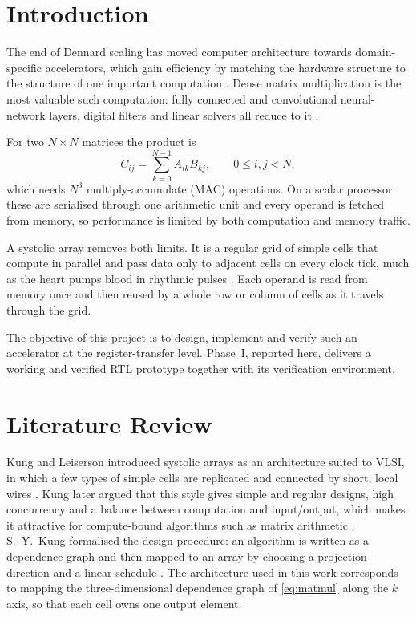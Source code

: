 \documentclass[conference]{IEEEtran}
\begin{document}
\section{Introduction}
The end of Dennard scaling has moved computer architecture towards
domain-specific accelerators, which gain efficiency by matching the hardware
structure to the structure of one important computation \cite{hennessy}. Dense
matrix multiplication is the most valuable such computation: fully connected
and convolutional neural-network layers, digital filters and linear solvers all
reduce to it \cite{sze}.

For two $N \times N$ matrices the product is
\begin{equation}
C_{ij} = \sum_{k=0}^{N-1} A_{ik} B_{kj}, \qquad 0 \le i,j < N,
\label{eq:matmul}
\end{equation}
which needs $N^3$ multiply-accumulate (MAC) operations. On a scalar processor
these are serialised through one arithmetic unit and every operand is fetched
from memory, so performance is limited by both computation and memory traffic.

A systolic array removes both limits. It is a regular grid of simple cells that
compute in parallel and pass data only to adjacent cells on every clock tick,
much as the heart pumps blood in rhythmic pulses \cite{kung1982}. Each operand
is read from memory once and then reused by a whole row or column of cells as it
travels through the grid.

The objective of this project is to design, implement and verify such an
accelerator at the register-transfer level. Phase~I, reported here, delivers a
working and verified RTL prototype together with its verification environment.

\section{Literature Review}
Kung and Leiserson introduced systolic arrays as an architecture suited to
VLSI, in which a few types of simple cells are replicated and connected by
short, local wires \cite{kungleiserson}. Kung later argued that this style
gives simple and regular designs, high concurrency and a balance between
computation and input/output, which makes it attractive for compute-bound
algorithms such as matrix arithmetic \cite{kung1982}. S.~Y.~Kung formalised the
design procedure: an algorithm is written as a dependence graph and then mapped
to an array by choosing a projection direction and a linear schedule
\cite{sykung}. The architecture used in this work corresponds to mapping the
three-dimensional dependence graph of \eqref{eq:matmul} along the $k$ axis, so
that each cell owns one output element.
\end{document}
